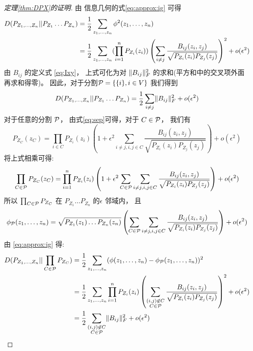 \begin{proof}[定理\ref{thm:DPX}的证明]
由 信息几何的式\eqref{eq:approx:ig} 可得
\begin{align*}
D(P_{Z_1,\dots, Z_n}|| P_{Z_1}\dots P_{Z_n}) & ={1 \over 2} \sum_{z_1,\dots,z_n}\phi^2(z_1,\dots, z_n) \\
& = {1\over 2}\sum_{z_1,\dots,z_n} (\prod_{i=1}^n  P_{Z_i} (z_i)) \left(\sum_{i\neq j}{B_{ij}(z_i, z_j) \over \sqrt{P_{Z_i}(z_i)P_{Z_j}(z_j)} }\right)^2 +o(\epsilon^2) 
\end{align*}
由 $B_{ij}$
的定义式 \eqref{eq:Ixy}，
上式可化为对 $\norm{B_{ij}}^2_F$
的求和(平方和中的交叉项外面再求和得零)。
因此，对于分割$\P=\{\{i\},i\in V\}$ 我们得到
\begin{equation}
D(P_{Z_1,\dots, Z_n}|| P_{Z_1}\dots P_{Z_n}) =   {1 \over 2} \sum_{i\neq j} \norm{B_{ij}}^2_F + o(\epsilon^2)
\end{equation}
对于任意的分割 $\P$，
由式\eqref{eq:sep}可得，对于 $C\in \P$，
我们有
\begin{equation}
P_{Z_C}(z_C) = \prod_{i\in C} P_{Z_i}(z_i)
\left(1 + \epsilon^2 \sum_{i\neq j,i,j\in C} \frac{B_{ij}(z_i, z_j)}{\sqrt{P_{Z_i}(z_i)P_{Z_j}(z_j)}}
\right) + o(\epsilon^2)
\end{equation}
将上式相乘可得:
\begin{equation}
\prod_{C\in \P}P_{Z_C}(z_C) = \prod_{i=1}^n P_{Z_i}(z_i)
\left(1+\epsilon^2 \sum_{C\in\P}\sum_{i\neq j,i,j\in C}\frac{B_{ij}(z_i, z_j)}{\sqrt{P_{Z_i}(z_i)P_{Z_j}(z_j)}}
\right) + o(\epsilon^2)
\end{equation}
所以 $\prod_{C\in \P}P_{Z_C}$ 在 $P_{Z_1}\dots P_{Z_n}$ 的$\epsilon$ 邻域内，
且 $$\phi_{\P}(z_1,\dots, z_n)=
\sqrt{P_{Z_1}(z_1)\dots P_{Z_n}(z_n)}\left(\sum_{C\in\P}\sum_{i\neq j,i,j\in C}\frac{B_{ij}(z_i, z_j)}{\sqrt{P_{Z_i}(z_i)P_{Z_j}(z_j)}}\right)+o(\epsilon^2)$$
由  \eqref{eq:approx:ig} 得:
\begin{align*}
D(P_{Z_1,\dots, Z_n}|| \prod_{C\in \P}P_{Z_C}) & ={1 \over 2} \sum_{z_1,\dots,z_n}(\phi(z_1,\dots, z_n)-\phi_{\P}(z_1, \dots, z_n))^2 \\
& = {1\over 2}\sum_{z_1,\dots,z_n} \prod_{i=1}^n  P_{Z_i} (z_i) \left(\sum_{\substack{(i,j) \not\in C\\ C\in \P}} {B_{ij}(z_i, z_j) \over \sqrt{P_{Z_i}(z_i)P_{Z_j}(z_j)} }\right)^2 +o(\epsilon^2) \\
& = \frac{1}{2} \sum_{\substack{(i,j) \not\in C\\ C\in \P}} \norm{B_{ij}}_F^2 + o(\epsilon^2)
\end{align*}
\end{proof}



